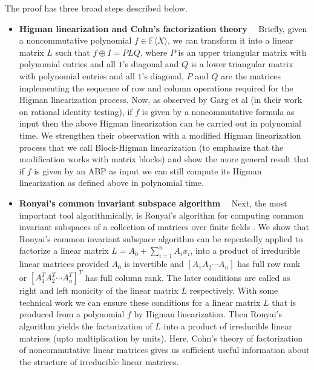 \documentclass[10pt,a4paper]{article}
\newcommand{\F}{\mathbb{F}}
\renewcommand{\angle}[1]{\langle #1 \rangle}
\newcommand{\FX}{\F\angle{X}}
\begin{document}
%


The proof has three broad steps described below.

\begin{itemize}
\item \textbf{Higman linearization and Cohn's factorization theory}~~
  Briefly, given a noncommutative polynomial $f\in\FX$, we can
  transform it into a linear matrix $L$ such that $f\oplus I = PLQ$,
  where $P$ is an upper triangular matrix with polynomial entries and
  all $1$'s diagonal and $Q$ is a lower triangular matrix with
  polynomial entries and all $1$'s diagonal, $P$ and $Q$ are the
  matrices implementing the sequence of row and column operations
  required for the Higman linearization process. Now, as observed
  by Garg et al \cite{GGOW20} (in their work on rational identity
  testing), if $f$ is given by a noncommutative formula as input
  then the above Higman linearization can be carried out in polynomial
  time. We strengthen their observation with a modified Higman
  linearization process that we call Block-Higman linearization (to
  emphasize that the modification works with matrix blocks) and
  show the more general result that if $f$ is given by an ABP as input
  we can still compute its Higman linearization as defined above
  in polynomial time.

%

\item \textbf{Ronyai's common invariant subspace algorithm}~~ Next,
  the most important tool algorithmically, is Ronyai's algorithm for
  computing common invariant subspaces of a collection of matrices
  over finite fields \cite{Ronyai2}. We show that Ronyai's common
  invariant subspace algorithm can be repeatedly applied to factorize
  a linear matrix $L=A_0+\sum_{i=1}^n A_i x_i$, into a product of
  irreducible linear matrices provided $A_0$ is invertible and
  $[A_1 A_2\cdots A_n]$ has full row rank or
  $[A_1^T A_2^T\cdots A_n^T]^T$ has full column rank. The later
  conditions are called as right and left monicity of the linear
  matrix $L$ respectively. With some technical work we can ensure
  these conditions for a linear matrix $L$ that is produced from a
  polynomial $f$ by Higman linearization. Then Ronyai's algorithm
  yields the factorization of $L$ into a product of irreducible linear
  matrices (upto multiplication by units). Here, Cohn's theory of
  factorization of noncommutative linear matrices gives us sufficient
  useful information about the structure of irreducible linear matrices.


\end{itemize}
\end{document}
